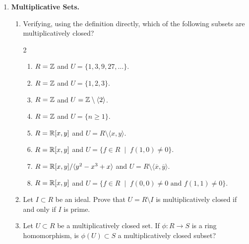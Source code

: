 \documentclass[12pt,reqno]{amsart}
\begin{document}
\begin{enumerate}[leftmargin=*]

\item \textbf{Multiplicative Sets.}
\begin{enumerate}
	\item Verifying, using the definition directly, which of the following subsets are multiplicatively closed?
	\begin{multicols}{2}
	\begin{enumerate}
    		\item $R = \mathbb{Z}$ and $U = \{1, 3, 9, 27, \ldots\}$.
    		\item $R = \mathbb{Z}$ and $U = \{1, 2, 3\}$.
		\item $R=\mathbb{Z}$ and $U=\mathbb{Z} \setminus\langle 2 \rangle$.
		\item $R=\mathbb{Z}$ and $U=\{n \geq 1\}$.
		\item $R=\mathbb{R}[x,y]$ and $U=R\setminus\langle x,y\rangle$.
		\item $R=\mathbb{R}[x,y]$ and $U = \{f \in R \;\; |\;\;  f(1,0) \neq 0\}$.
		\item $R=\mathbb{R}[x,y]/\langle y^2-x^3+x\rangle$ and $U=R\setminus\langle \overline{x}, \overline{y} \rangle$.
		\item $R=\mathbb{R}[x,y]$ and $U = \{f \in R \;\; |\;\;  f(0,0) \neq 0 \text{ and } f(1,1) \neq 0\}$.
	\end{enumerate}
	\end{multicols}
	\item\label{ex-pt:prime-mult-set} Let $I \subset R$ be an ideal. Prove that $U=R\setminus I$ is multiplicatively closed if and only if $I$ is prime. 
	\item Let $U \subset R$ be a multiplicatively closed set. If $\phi:R\to S$ is a ring homomorphism, is $\phi(U) \subset S$ a multiplicatively closed subset?
\end{enumerate}


\end{enumerate}
\end{document}
